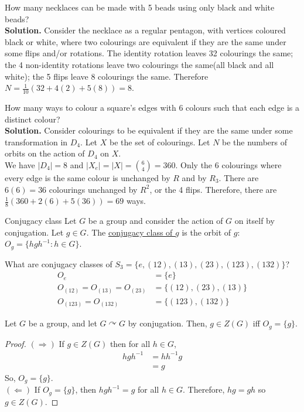 \documentclass[12pt]{article}
\newcommand{\inv}{^{-1}}
\begin{document}
	\begin{myex}{}{}
		How many necklaces can be made with 5 beads using only black and white beads?\\
		
		\textbf{Solution.} Consider the necklace as a regular pentagon, with vertices coloured black or white, where two colourings are equivalent if they are the same under some flips and/or rotations. The identity rotation leaves 32 colourings the same; the 4 non-identity rotations leave two colourings the same(all black and all white); the 5 flips leave 8 colourings the same. Therefore $N=\frac{1}{10}(32+4(2)+5(8))=8$.
	\end{myex}
	
	\begin{myex}{}{}
		How many ways to colour a square's edges with 6 colours such that each edge is a distinct colour?\\
		
		\textbf{Solution.} Consider colourings to be equivalent if they are the same under some transformation in $D_4$. Let $X$ be the set of colourings. Let $N$ be the numbers of orbits on the action of $D_4$ on $X$.\\
		
		We have $|D_4|=8$ and $|X_e|=|X|=\binom{6}{4}=360$. Only the 6 colourings where every edge is the same colour is unchanged by $R$ and by $R_3$. There are $6(6)=36$ colourings unchanged by $R^2$, or the 4 flips. Therefore, there are $\frac{1}{8}(360+2(6)+5(36))=69$ ways.
	\end{myex}
	
	\begin{mydef}{Conjugacy class}{}
		Let $G$ be a group and consider the action of $G$ on itself by conjugation. Let $g\in G$. The \underline{conjugacy class of $g$} is the orbit of $g$: $O_g=\{hgh\inv:h\in G\}$.
	\end{mydef}
	
	\begin{myex}{}{}
		What are conjugacy classes of $S_3=\{e, (12), (13), (23), (123), (132)\}$?
		\begin{align*}
			O_e&=\{e\}\\
			O_{(12)}=O_{(13)}=O_{(23)}&=\{(12), (23), (13)\}\\
			O_{(123)}=O_{(132)}&=\{(123), (132)\}
		\end{align*}
	\end{myex}
	
	\begin{myprop}{}{}
		Let $G$ be a group, and let $G\curvearrowright G$ by conjugation. Then, $g\in Z(G)$ iff $O_g=\{g\}$.
		\begin{proof}
			$(\Rightarrow)$ If $g\in Z(G)$ then for all $h\in G$,
			\begin{align*}
				hgh\inv&=hh\inv g\\
				&=g
			\end{align*}
			So, $O_g=\{g\}$.\\
			
			$(\Leftarrow)$ If $O_g=\{g\}$, then $hgh\inv=g$ for all $h\in G$. Therefore, $hg=gh$ so $g\in Z(G)$.
		\end{proof}
	\end{myprop}
	
\end{document}
